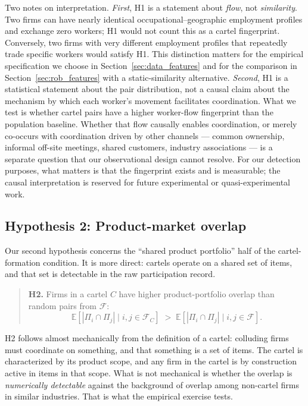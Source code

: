 Two notes on interpretation. \emph{First}, H1 is a statement about \emph{flow}, not \emph{similarity}. Two firms can have nearly identical occupational--geographic employment profiles and exchange zero workers; H1 would not count this as a cartel fingerprint. Conversely, two firms with very different employment profiles that repeatedly trade specific workers would satisfy H1. This distinction matters for the empirical specification we choose in Section~\ref{sec:data_features} and for the comparison in Section~\ref{sec:rob_features} with a static-similarity alternative. \emph{Second}, H1 is a statistical statement about the pair distribution, not a causal claim about the mechanism by which each worker's movement facilitates coordination. What we test is whether cartel pairs have a higher worker-flow fingerprint than the population baseline. Whether that flow causally enables coordination, or merely co-occurs with coordination driven by other channels --- common ownership, informal off-site meetings, shared customers, industry associations --- is a separate question that our observational design cannot resolve. For our detection purposes, what matters is that the fingerprint exists and is measurable; the causal interpretation is reserved for future experimental or quasi-experimental work.

\subsection{Hypothesis 2: Product-market overlap}

Our second hypothesis concerns the ``shared product portfolio'' half of the cartel-formation condition. It is more direct: cartels operate on a shared set of items, and that set is detectable in the raw participation record.

\begin{quotation}
\noindent\textbf{H2.} Firms in a cartel $C$ have higher product-portfolio overlap than random pairs from $\mathcal{F}$:
\[
\mathbb{E}\!\left[|\Pi_i \cap \Pi_j| \mid i, j \in \mathcal{F}_C \right]
\;>\;
\mathbb{E}\!\left[|\Pi_i \cap \Pi_j| \mid i, j \in \mathcal{F} \right].
\]
\end{quotation}

H2 follows almost mechanically from the definition of a cartel: colluding firms must coordinate on something, and that something is a set of items. The cartel is characterized by its product scope, and any firm in the cartel is by construction active in items in that scope. What is not mechanical is whether the overlap is \emph{numerically detectable} against the background of overlap among non-cartel firms in similar industries. That is what the empirical exercise tests.

